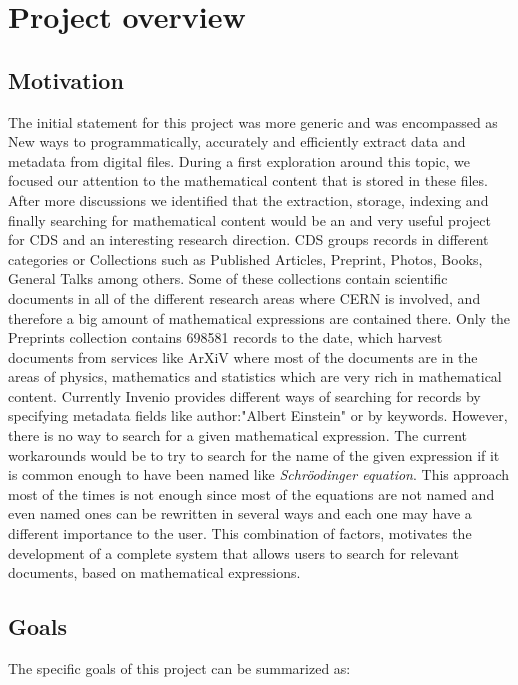 \section{Project overview}
\subsection{Motivation}
The initial statement for this project was more generic and was encompassed as New ways to programmatically, accurately and efficiently extract data and metadata from digital files. During a first exploration around this topic, we focused our attention to the mathematical content that is stored in these files. After more discussions we identified that the extraction, storage, indexing and finally searching for mathematical content would be an and very useful project for CDS and an interesting research direction. CDS groups records in different categories or Collections such as Published Articles, Preprint, Photos, Books, General Talks among others. Some of these collections contain scientific documents in all of the different research areas where CERN is involved, and therefore a big amount of mathematical expressions are contained there. Only the Preprints collection contains 698581 records to the date, which harvest documents from services like ArXiV\cite{arxiv} where most of the documents are in the areas of physics, mathematics and statistics which are very rich in mathematical content.
Currently Invenio provides different ways of searching for records by specifying metadata fields like author:"Albert Einstein" or by keywords. However, there is no way to search for a given mathematical expression. The current workarounds would be to try to search for the name of the given expression if it is common enough to have been named like \emph{Schr\"oodinger equation}. This approach most of the times is not enough since most of the equations are not named and even named ones can be rewritten in several ways and each one may have a different importance to the user. This combination of factors, motivates the development of a complete system that allows users to search for relevant documents, based on mathematical expressions.

\subsection{Goals}

The specific goals of this project can be summarized as:

